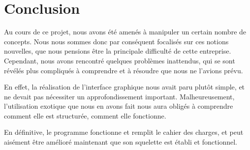 
\section{Conclusion}
\label{sec:conclusion}

\par Au cours de ce projet, nous avons été amenés à manipuler un certain nombre de concepts. Nous nous sommes donc par conséquent focalisés sur ces notions nouvelles, que nous pensions être la principale difficulté de cette entreprise. Cependant, nous avons rencontré quelques problèmes inattendus, qui se sont révélés plus compliqués à comprendre et à résoudre que nous ne l'avions prévu. \par En effet, la réalisation de l'interface graphique nous avait paru plutôt simple, et ne devait pas nécessiter un approfondissement important. Malheureusement, l'utilisation \og exotique\fg{} que nous en avons fait nous aura obligés à comprendre comment elle est structurée, comment elle fonctionne.
\par En définitive, le programme fonctionne et remplit le cahier des charges, et peut aisément être amélioré maintenant que son squelette est établi et fonctionnel.


